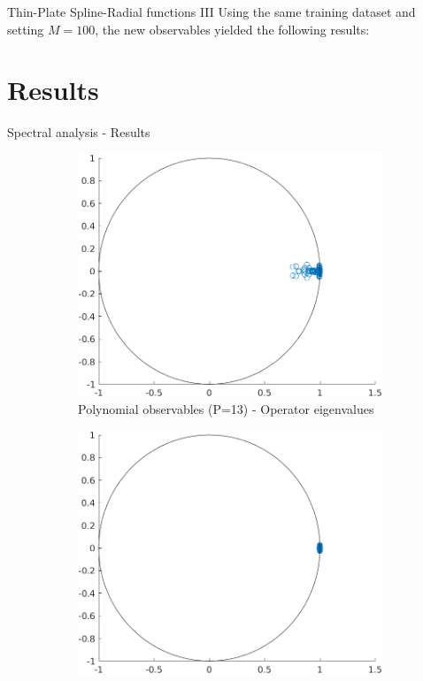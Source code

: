 \documentclass{beamer}
\begin{document}
\begin{frame}{Thin-Plate Spline-Radial functions III}
    Using the same training dataset and setting $M=100$, the new observables yielded the following results:
\end{frame}


\section{Results}

\begin{frame}{Spectral analysis - Results}
    \begin{figure}
        \centering
        \begin{subfigure}[b]{0.45\textwidth}
            \centering
            \includegraphics[width=\textwidth]{Eigen_Poly.png}
            \caption{Polynomial observables (P=13) - Operator eigenvalues}
            \label{fig:eigen_poly}
        \end{subfigure}
        \hfill
        \begin{subfigure}[b]{0.45\textwidth}
            \centering
            \includegraphics[width=\textwidth]{Eigen_Radial.png}

\end{subfigure}
\end{figure}
\end{frame}
\end{document}
